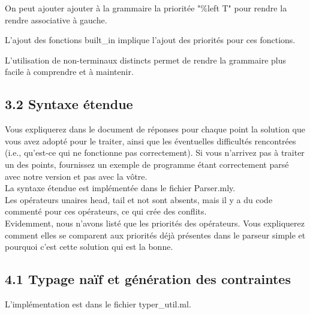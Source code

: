\documentclass{article}
\begin{document}
{
  On peut ajouter ajouter à la grammaire la prioritée "\%left T" pour rendre la rendre associative à gauche.
}
{}


{
  L'ajout des fonctions built\_in implique l'ajout des priorités pour ces fonctions.
}
{}

{
  L'utilisation de non-terminaux distincts permet de rendre la grammaire plus facile à comprendre et à maintenir.
}
{}

\subsection{3.2 Syntaxe étendue}

Vous expliquerez dans le document de réponses pour chaque point la solution
que vous avez adopté pour le traiter, ainsi que les éventuelles difficultés
rencontrées (i.e., qu'est-ce qui ne fonctionne pas correctement). Si vous
n'arrivez pas à traiter un des points, fournissez un exemple de programme
étant correctement parsé avec notre version et pas avec la vôtre.\\

La syntaxe étendue est implémentée dans le fichier Parser.mly.\\
Les opérateurs unaires head, tail et not sont absents, mais il y a du code commenté pour ces opérateurs, ce qui crée des conflits.\\

Evidemment, nous n'avons listé que les priorités des opérateurs. Vous
expliquerez comment elles se comparent aux priorités déjà présentes dans le
parseur simple et pourquoi c'est cette solution qui est la bonne.

\subsection{4.1 Typage naïf et génération des contraintes}

{
  L'implémentation est dans le fichier typer\_util.ml.\\
}
{}
\end{document}
